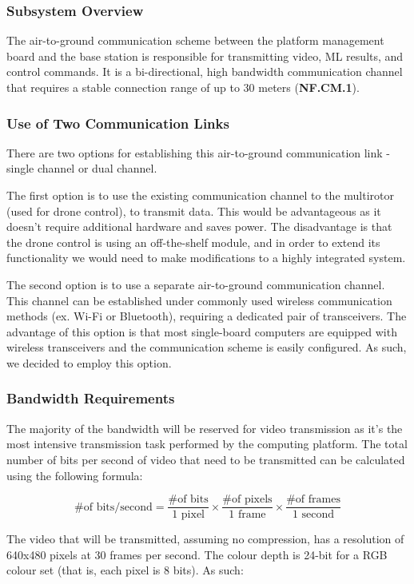 \subsubsection{Subsystem Overview}
The air-to-ground communication scheme between the platform management board and the base station is responsible for transmitting video, ML results, and control commands. It is a bi-directional, high bandwidth communication channel that requires a stable connection range of up to 30 meters (\textbf{NF.CM.1}).

\subsubsection{Use of Two Communication Links}
There are two options for establishing this air-to-ground communication link - single channel or dual channel. 

The first option is to use the existing communication channel to the multirotor (used for drone control), to transmit data. This would be advantageous as it doesn't require additional hardware and saves power. The disadvantage is that the drone control is using an off-the-shelf module, and in order to extend its functionality we would need to make modifications to a highly integrated system. 

The second option is to use a separate air-to-ground communication channel. This channel can be established under commonly used wireless communication methods (ex. Wi-Fi or Bluetooth), requiring a dedicated pair of transceivers. The advantage of this option is that most single-board computers are equipped with wireless transceivers and the communication scheme is easily configured. As such, we decided to employ this option.

\subsubsection{Bandwidth Requirements}

The majority of the bandwidth will be reserved for video transmission as it's the most intensive transmission task performed by the computing platform. The total number of bits per second of video that need to be transmitted can be calculated using the following formula:

$$
\text{\# of bits/second} = \frac{\text{\# of bits}}{\text{1 pixel}} \times \frac{\text{\# of pixels}}{\text{1 frame}} \times \frac{\text{\# of frames}}{\text{1 second}}
$$

The video that will be transmitted, assuming no compression, has a resolution of 640x480 pixels at 30 frames per second. The colour depth is 24-bit for a RGB colour set (that is, each pixel is 8 bits). As such:

